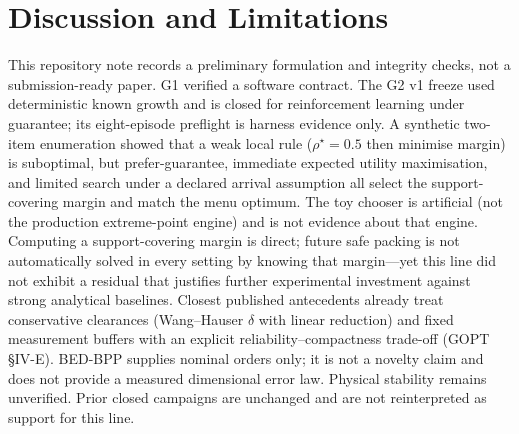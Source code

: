 \section{Discussion and Limitations}

This repository note records a preliminary formulation and integrity checks, not a
submission-ready paper. G1 verified a software contract. The G2 v1 freeze used
deterministic known growth and is closed for reinforcement learning under
guarantee; its eight-episode preflight is harness evidence only. A synthetic
two-item enumeration showed that a weak local rule (\(\rho^\star=0.5\) then
minimise margin) is suboptimal, but prefer-guarantee, immediate expected
utility maximisation, and limited search under a declared arrival assumption all
select the support-covering margin and match the menu optimum. The toy chooser
is artificial (not the production extreme-point engine) and is not evidence about
that engine. Computing a support-covering margin is direct; future safe packing
is not automatically solved in every setting by knowing that margin---yet this
line did not exhibit a residual that justifies further experimental investment
against strong analytical baselines. Closest published antecedents already
treat conservative clearances (Wang--Hauser $\delta$ with linear reduction) and
fixed measurement buffers with an explicit reliability--compactness trade-off
(GOPT §IV-E). BED-BPP supplies nominal orders only; it is not a novelty claim
and does not provide a measured dimensional error law. Physical stability
remains unverified. Prior closed campaigns are unchanged and are not
reinterpreted as support for this line.
